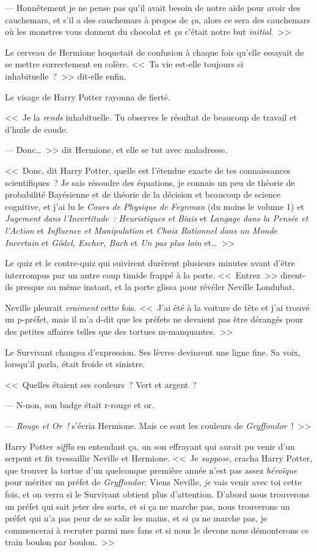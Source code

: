 --- Honnêtement je ne pense pas qu'il avait besoin de notre aide pour avoir des cauchemars, et s'il a des cauchemars à propos de \emph{ça}, alors ce sera des cauchemars où les monstres vous donnent du chocolat et \emph{ça} c'était notre but \emph{initial}.~>>

Le cerveau de Hermione hoquetait de confusion à chaque fois qu'elle essayait de se mettre correctement en colère. <<~Ta vie est-elle toujours si inhabituelle~?~>> dit-elle enfin.

Le visage de Harry Potter rayonna de fierté.

<<~Je la \emph{rends} inhabituelle. Tu observes le résultat de beaucoup de travail et d'huile de coude.

--- Donc…~>> dit Hermione, et elle se tut avec maladresse.

<<~Donc, dit Harry Potter, quelle est l'étendue exacte de tes connaissances scientifiques~? Je sais résoudre des équations, je connais un peu de théorie de probabilité Bayésienne et de théorie de la décision et beaucoup de science cognitive, et j'ai lu le \emph{Cours de Physique de Feynman} (du moins le volume 1) et \emph{Jugement dans l'Incertitude~: Heuristiques et Biais} et \emph{Langage dans la Pensée et l'Action} et \emph{Influence et Manipulation} et \emph{Choix Rationnel dans un Monde Incertain} et \emph{Gödel, Escher, Bach} et \emph{Un pas plus loin} et…~>>

Le quiz et le contre-quiz qui suivirent durèrent plusieurs minutes avant d'être interrompus par un autre coup timide frappé à la porte. <<~Entrez~>> dirent-ils presque au même instant, et la porte glissa pour révéler Neville Londubat.

Neville pleurait \emph{vraiment} cette fois. <<~J'ai été à la voiture de tête et j'ai trouvé un p-préfet, mais il m'a d-dit que les préfets ne devaient pas être dérangés pour des petites affaires telles que des tortues m-manquantes.~>>

Le Survivant changea d'expression. Ses lèvres devinrent une ligne fine. Sa voix, lorsqu'il parla, était froide et sinistre.

<<~Quelles étaient ses couleurs~? Vert et argent~?

--- N-non, son badge était r-rouge et or.

--- \emph{Rouge et Or~!} s'écria Hermione. Mais ce sont les couleurs de \emph{Gryffondor}~!~>>

Harry Potter \emph{siffla} en entendant ça, un son effrayant qui aurait pu venir d'un serpent et fit tressaillir Neville et Hermione. <<~Je \emph{suppose}, cracha Harry Potter, que trouver la tortue d'un quelconque première année n'est pas assez \emph{héroïque} pour mériter un préfet de \emph{Gryffondor}. Viens Neville, \emph{je} vais venir avec toi cette fois, et on verra si le Survivant obtient plus d'attention. D'abord nous trouverons un préfet qui sait jeter des sorts, et si ça ne marche pas, nous trouverons un préfet qui n'a pas peur de se salir les mains, et si \emph{ça} ne marche pas, je commencerai à recruter parmi mes fans et si nous le devons nous démonterons ce train boulon par boulon.~>>

